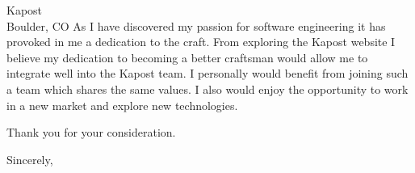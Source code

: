 \documentclass{letter}
\begin{document}
\begin{letter}{Kapost\\Boulder, CO}
As I have discovered my passion for software engineering it has
provoked in me a dedication to the craft.  From exploring the Kapost
website I believe my dedication to becoming a better craftsman would
allow me to integrate well into the Kapost team.  I personally would
benefit from joining such a team which shares the same values.  I
also would enjoy the opportunity to work in a new market and explore
new technologies.

Thank you for your consideration.

\closing{Sincerely,}
\end{letter}
\end{document}
